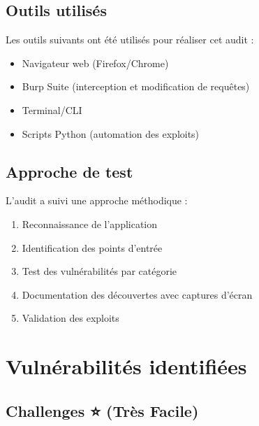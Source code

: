 \documentclass[12pt,a4paper]{report}
\begin{document}
\section{Outils utilisés}
Les outils suivants ont été utilisés pour réaliser cet audit :
\begin{itemize}
    \item Navigateur web (Firefox/Chrome)
    \item Burp Suite (interception et modification de requêtes)
    \item Terminal/CLI
    \item Scripts Python (automation des exploits)
\end{itemize}

\section{Approche de test}
L'audit a suivi une approche méthodique :
\begin{enumerate}
    \item Reconnaissance de l'application
    \item Identification des points d'entrée
    \item Test des vulnérabilités par catégorie
    \item Documentation des découvertes avec captures d'écran
    \item Validation des exploits
\end{enumerate}

\chapter{Vulnérabilités identifiées}

\section{Challenges ⭐ (Très Facile)}
\end{document}
